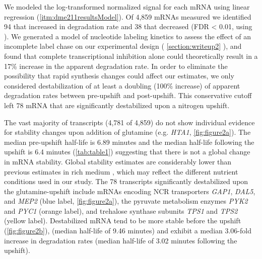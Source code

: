 We modeled the
log-transformed normalized signal for each mRNA using linear
regression (\autoref{itm:dme211resultsModel}).
Of 4,859 mRNAs measured we identified 94 that increased in 
degradation rate and 38 that decreased (FDR < 0.01, using
\cite{storey2003statistical}). 
We generated a model of nucleotide
labeling kinetics to assess the effect of an incomplete label 
chase on our experimental design ( \autoref{section:writeup2} ),
 and found that complete transcriptional inhibition alone could 
theoretically result in a 17\% increase in the apparent 
degradation rate. In order to eliminate the possibility that
rapid synthesis changes could affect our estimates,
we only considered destabilization of at least a
doubling (100\% increase) of apparent degradation rates between 
pre-upshift and post-upshift.
This conservative cutoff 
left 78 mRNA that are significantly destabilized 
upon a nitrogen upshift. 

The vast majority of transcripts (4,781 of 4,859) do not show
individual evidence for stability changes upon addition of glutamine
(e.g. \textit{HTA1}, \autoref{fig:figure2a}). 
The median pre-upshift half-life is 6.89 minutes and the median
half-life following the upshift is 6.4 minutes (\autoref{tab:table1})
suggesting that there is not a global change in mRNA stability.
Global stability estimates are
considerably lower than previous estimates in rich medium
\parencite{munchel2011dynamic,neymotin2014determination,miller2011dynamic}, 
which may reflect the
different nutrient conditions used in our study. 
The 78 transcripts significantly destabilized upon the 
glutamine-upshift include
mRNAs encoding NCR transporters \textit{GAP1}, \textit{DAL5}, and
\textit{MEP2} (blue label, \autoref{fig:figure2a}), the pyruvate metabolism enzymes
\textit{PYK2} and \textit{PYC1} (orange label), and trehalose synthase
subunits \textit{TPS1} and
\textit{TPS2} (yellow label).
Destabilized mRNA tend to be more stable before the upshift
(\autoref{fig:figure2b}),
(median half-life of 9.46 minutes) and exhibit 
a median 3.06-fold increase in degradation rates (median half-life of
3.02 minutes following the upshift). 

\label{subsection:stabilityChanges}

